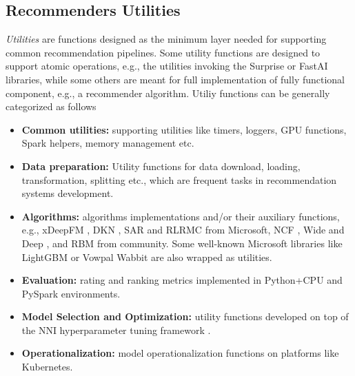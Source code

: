 \subsection{Recommenders Utilities}

{\em Utilities} are functions designed as the minimum layer needed for supporting common recommendation pipelines.
Some utility functions are designed to support atomic operations, e.g., the utilities invoking the Surprise \cite{Surprise} or 
FastAI \cite{howard2018fastai} libraries, while some others are meant for full implementation of fully functional component, e.g., a recommender algorithm. Utiliy functions can be generally categorized as follows
\begin{itemize}
    \item \textbf{Common utilities:} supporting utilities like timers, loggers, GPU functions, 
    Spark helpers, memory management etc.
    \item \textbf{Data preparation:} Utility functions for data download, loading, 
    transformation, splitting etc., which are frequent tasks in recommendation systems development. 
    \item \textbf{Algorithms:} algorithms implementations and/or their auxiliary functions, e.g., xDeepFM \cite{lian2018xdeepfm}, DKN \cite{wang2018dkn}, SAR \cite{diev2015sar} and RLRMC \cite{rlrmc} from Microsoft, NCF 
    \cite{he2017neural}, Wide and Deep \cite{cheng2016wide}, and RBM \cite{salakhutdinov2007restricted} from community. 
    Some well-known Microsoft libraries like LightGBM \cite{ke2017lightgbm} or Vowpal Wabbit \cite{agarwal2014reliable} are also wrapped as utilities.
    \item \textbf{Evaluation:} rating and ranking metrics implemented in Python+CPU and PySpark environments.
    \item \textbf{Model Selection and Optimization:} utility functions developed on top of the NNI hyperparameter 
    tuning framework \cite{nni}. 
    \item \textbf{Operationalization:} model operationalization functions on platforms like Kubernetes.
\end{itemize}
    

